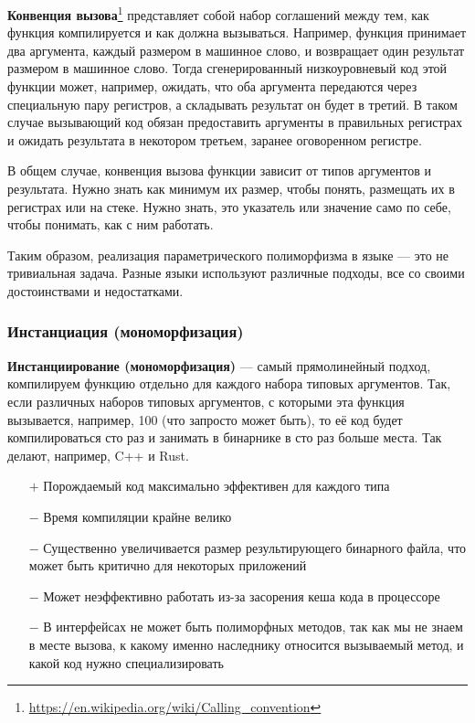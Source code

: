 \documentclass[12pt]{article}
\newcommand{\vocab}[1]{\textbf{#1}} %
\newcommand{\positive}{$+$} %
\newcommand{\negative}{{\color{red} $-$}} %
\begin{document}
    \vocab{Конвенция вызова}\footnote{\url{https://en.wikipedia.org/wiki/Calling_convention}} представляет собой набор соглашений между тем, как функция компилируется и как должна вызываться.
    Например, функция принимает два аргумента, каждый размером в машинное слово, и возвращает один результат размером в машинное слово.
    Тогда сгенерированный низкоуровневый код этой функции может, например, ожидать, что оба аргумента передаются через специальную пару регистров, а складывать результат он будет в третий.
    В таком случае вызывающий код обязан предоставить аргументы в правильных регистрах и ожидать результата в некотором третьем, заранее оговоренном регистре.

    В общем случае, конвенция вызова функции зависит от типов аргументов и результата.
    Нужно знать как минимум их размер, чтобы понять, размещать их в регистрах или на стеке.
    Нужно знать, это указатель или значение само по себе, чтобы понимать, как с ним работать.

    Таким образом, реализация параметрического полиморфизма в языке --- это не тривиальная задача.
    Разные языки используют различные подходы, все со своими достоинствами и недостатками.

    \subsubsection{Инстанциация (мономорфизация)}

    \vocab{Инстанциирование (мономорфизация)} --- самый прямолинейный подход, компилируем функцию отдельно для каждого набора типовых аргументов.
    Так, если различных наборов типовых аргументов, с которыми эта функция вызывается, например, 100 (что запросто может быть), то её код будет компилироваться сто раз и занимать в бинарнике в сто раз больше места.
    Так делают, например, C++ и Rust.

    \begin{itemize}
        \item[\positive] Порождаемый код максимально эффективен для каждого типа
        \item[\negative] Время компиляции крайне велико
        \item[\negative] Существенно увеличивается размер результирующего бинарного файла, что может быть критично для некоторых приложений
        \item[\negative] Может неэффективно работать из-за засорения кеша кода в процессоре
        \item[\negative] В интерфейсах не может быть полиморфных методов, так как мы не знаем в месте вызова, к какому именно наследнику относится вызываемый метод, и какой код нужно специализировать
    \end{itemize}
\end{document}
